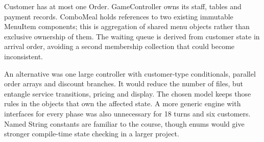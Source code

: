 Customer has at most one Order. GameController owns its staff, tables and
payment records. ComboMeal holds references to two existing immutable MenuItem
components; this is aggregation of shared menu objects rather than exclusive
ownership of them. The waiting queue is derived from customer state in arrival
order, avoiding a second membership collection that could become inconsistent.

An alternative was one large controller with customer-type conditionals,
parallel order arrays and discount branches. It would reduce the number of
files, but entangle service transitions, pricing and display. The chosen model
keeps those rules in the objects that own the affected state. A more generic
engine with interfaces for every phase was also unnecessary for 18 turns and
six customers. Named String constants are familiar to the course, though enums
would give stronger compile-time state checking in a larger project.
